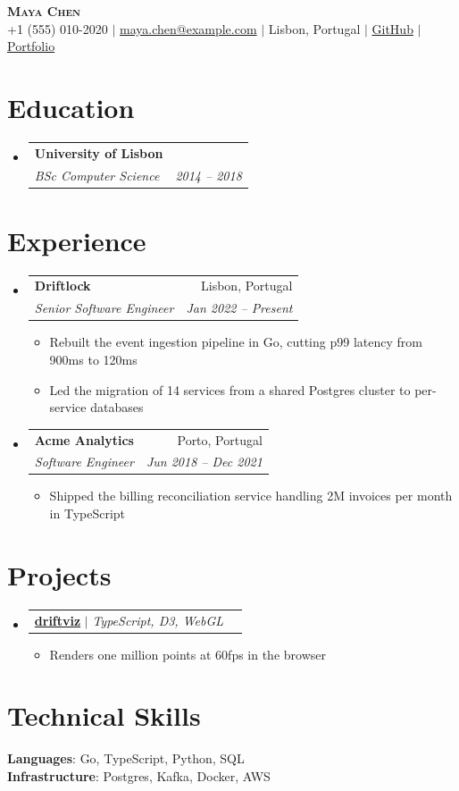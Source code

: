 \documentclass[letterpaper,11pt]{article}
\makeatletter
\newcommand{\resumeItem}[1]{
  \item\small{
    {#1 \vspace{-2pt}}
  }
}
\newcommand{\resumeSubheading}[4]{
  \vspace{-2pt}\item
    \begin{tabular*}{0.97\textwidth}[t]{l@{\extracolsep{\fill}}r}
      \textbf{#1} & #2 \\
      \textit{\small#3} & \textit{\small #4} \\
    \end{tabular*}\vspace{-7pt}
}
\newcommand{\resumeProjectHeading}[2]{
    \item
    \begin{tabular*}{0.97\textwidth}{l@{\extracolsep{\fill}}r}
      \small#1 & #2 \\
    \end{tabular*}\vspace{-7pt}
}
\newcommand{\resumeSubHeadingListStart}{\begin{itemize}[leftmargin=0.15in, label={}]}
\newcommand{\resumeSubHeadingListEnd}{\end{itemize}}
\newcommand{\resumeItemListStart}{\begin{itemize}}
\newcommand{\resumeItemListEnd}{\end{itemize}\vspace{-5pt}}
\makeatother
\begin{document}
\begin{center}
    \textbf{\Huge \scshape Maya Chen} \\ \vspace{1pt}
    \small +1 (555) 010-2020 $|$ \href{mailto:maya.chen@example.com}{maya.chen@example.com} $|$ Lisbon, Portugal $|$ \href{https://github.com/mayachen}{GitHub} $|$ \href{https://mayachen.dev}{Portfolio}
\end{center}


\section{Education}
  \resumeSubHeadingListStart
    \resumeSubheading
      {University of Lisbon}{}
      {BSc Computer Science}{2014 -- 2018}
  \resumeSubHeadingListEnd


\section{Experience}
  \resumeSubHeadingListStart

    \resumeSubheading
      {Driftlock}{Lisbon, Portugal}
      {Senior Software Engineer}{Jan 2022 -- Present}
      \resumeItemListStart
        \resumeItem{Rebuilt the event ingestion pipeline in Go, cutting p99 latency from 900ms to 120ms}
        \resumeItem{Led the migration of 14 services from a shared Postgres cluster to per-service databases}
      \resumeItemListEnd

    \resumeSubheading
      {Acme Analytics}{Porto, Portugal}
      {Software Engineer}{Jun 2018 -- Dec 2021}
      \resumeItemListStart
        \resumeItem{Shipped the billing reconciliation service handling 2M invoices per month in TypeScript}
      \resumeItemListEnd

  \resumeSubHeadingListEnd


\section{Projects}
  \resumeSubHeadingListStart

    \resumeProjectHeading
      {\href{https://github.com/mayachen/driftviz}{\textbf{driftviz}} $|$ \emph{TypeScript, D3, WebGL}}{}
      \resumeItemListStart
        \resumeItem{Renders one million points at 60fps in the browser}
      \resumeItemListEnd

  \resumeSubHeadingListEnd


\section{Technical Skills}
 \begin{itemize}[leftmargin=0.15in, label={}]
    \small{\item{
     \textbf{Languages}{: Go, TypeScript, Python, SQL} \\
     \textbf{Infrastructure}{: Postgres, Kafka, Docker, AWS}
    }}
 \end{itemize}
\end{document}
